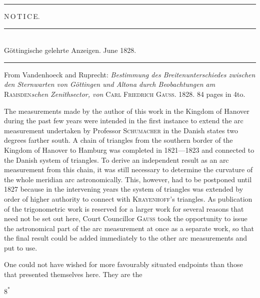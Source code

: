 \begin{center}\rule{.24\textwidth}{.4pt}\end{center}

\par\clearpage

\vspace*{.075\textheight}
\begin{center}{\LARGE N\,O\,T\,I\,C\,E.}\end{center}
\vspace{.045\textheight}
\begin{center}
\rule{.52\textwidth}{.4pt}\\[-.2ex]
{\small Göttingische gelehrte Anzeigen. June 1828.}\\[-.2ex]
\rule{.52\textwidth}{.4pt}
\end{center}

From Vandenhoeck and Ruprecht: \textit{Bestimmung des Breitenunterschiedes
zwischen den Sternwarten von Göttingen und Altona durch Beobachtungen am}
\textsc{Ramsden}\textit{schen Zenithsector, von} \textsc{Carl Friedrich Gauss}.
1828. 84 pages in 4to.

The measurements made by the author of this work in the Kingdom of Hanover
during the past few years were intended in the first instance to extend the arc measurement
undertaken by Professor \textsc{Schumacher} in the Danish states two degrees
farther south. A chain of triangles from the southern border of the Kingdom of
Hanover to Hamburg was completed in 1821---1823 and connected to the Danish
system of triangles. To derive an independent result as an arc measurement from
this chain, it was still necessary to determine the curvature of the whole
meridian arc astronomically. This, however, had to be postponed until 1827
because in the intervening years the system of triangles was extended by order
of higher authority to connect with \textsc{Krayenhoff}'s triangles. As publication
of the trigonometric work is reserved for a larger work for several reasons
that need not be set out here, Court Councillor \textsc{Gauss} took the opportunity
to issue the astronomical part of the arc measurement at once as a separate
work, so that the final result could be added immediately to the other arc
measurements and put to use.

One could not have wished for more favourably situated endpoints than those
that presented themselves here. They are the
\par\smallskip
\noindent\hfill \(8^{*}\)\hspace{.12\textwidth}\par

